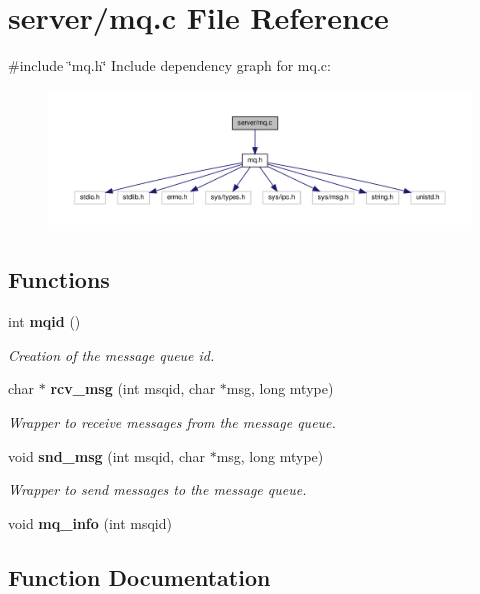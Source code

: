 \section{server/mq.c File Reference}
\label{mq_8c}
{\ttfamily \#include \char`\"{}mq.\+h\char`\"{}}\newline
Include dependency graph for mq.\+c\+:\nopagebreak
\begin{figure}[H]
\begin{center}
\leavevmode
\includegraphics[width=350pt]{mq_8c__incl}
\end{center}
\end{figure}
\subsection*{Functions}
\begin{DoxyCompactItemize}
\item 
int \textbf{ mqid} ()
\begin{DoxyCompactList}\small\item\em Creation of the message queue id. \end{DoxyCompactList}\item 
char $\ast$ \textbf{ rcv\+\_\+msg} (int msqid, char $\ast$msg, long mtype)
\begin{DoxyCompactList}\small\item\em Wrapper to receive messages from the message queue. \end{DoxyCompactList}\item 
void \textbf{ snd\+\_\+msg} (int msqid, char $\ast$msg, long mtype)
\begin{DoxyCompactList}\small\item\em Wrapper to send messages to the message queue. \end{DoxyCompactList}\item 
void \textbf{ mq\+\_\+info} (int msqid)
\end{DoxyCompactItemize}


\subsection{Function Documentation}
\mbox{\label{mq_8c_ad6373ac4d80e0c6198e95bb3a0515ff4}} 

